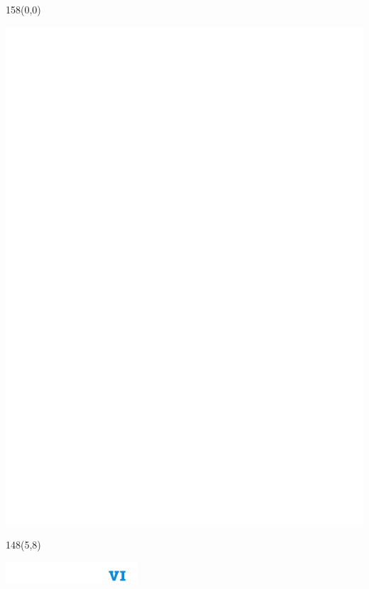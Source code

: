 \documentclass{extarticle}
\begin{document}
\pagecolor{black}
\pagestyle{empty}

\begin{textblock}{158}(0,0)
\vfill
{\centerline{\includegraphics[scale=1,]{tools/images/notebook-background-marks.pdf}}} 
\vfill
\end{textblock}


\begin{textblock}{148}(5,8)
\vfill
{\centerline{\includegraphics[height=8mm,]{tools/images/blok-navic-6.pdf}}}
\vfill
\end{textblock}
\end{document}
